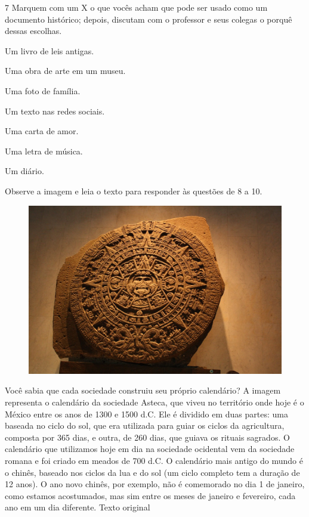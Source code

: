 \num{7} Marquem com um X o que vocês acham que pode ser usado como um documento
histórico; depois, discutam com o professor e seus colegas o porquê
dessas escolhas.

\begin{boxlist}
\item
  Um livro de leis antigas.
\item
  Uma obra de arte em um museu.
\item
  Uma foto de família.
\item
  Um texto nas redes sociais.
\item
  Uma carta de amor.
\item
  Uma letra de música.
\item
  Um diário.
\end{boxlist}


\pagebreak
Observe a imagem e leia o texto para responder às questões de 8 a 10.

\begin{figure}[htpb!]
\centering
\includegraphics[width=.5\textwidth]{./imgs/img32.png}
\end{figure}

\noindent{}Você sabia que cada sociedade construiu seu próprio calendário? A imagem representa o calendário da sociedade Asteca, que viveu no território onde hoje é o México entre os anos de 1300 e 1500 d.C. Ele
é dividido em duas partes: uma baseada no ciclo do sol, que era utilizada para guiar os ciclos da agricultura, composta por 365 dias, e outra, de 260 dias, que guiava os rituais sagrados. O calendário que
utilizamos hoje em dia na sociedade ocidental vem da sociedade romana e foi criado em meados de 700 d.C. O calendário mais antigo do mundo é o chinês, baseado nos ciclos da lua e do sol (um ciclo completo tem a duração de 12 anos). O ano novo chinês, por exemplo, não é comemorado no dia 1 de janeiro, como estamos acostumados, mas sim entre os meses de janeiro e fevereiro, cada ano em um dia diferente. Texto original

